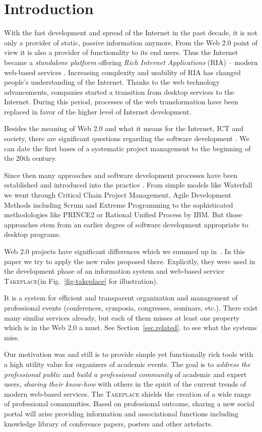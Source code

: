 \documentclass[conference]{IEEEtran}
\newcommand\tp{\textsc{Takeplace}\xspace}
\begin{document}
\section{Introduction}
With the fast development and spread of the Internet in the past decade, it is
not only a provider of static, passive information anymore. From the Web 2.0
point of view it is also a provider of functionality to its end users.  Thus
the Internet became a \emph{standalone platform} offering \emph{Rich Internet
Applications} (RIA) -- modern web-based services \cite{o2007web}. Increasing
complexity and usability of RIA has changed people's understanding of the
Internet. Thanks to the web technology advancements, companies started a
transition from desktop services to the Internet. During this period,
processes of the web transformation have been replaced in favor of the higher
level of Internet development.

Besides the meaning of Web 2.0 and what it means for the Internet, ICT and
society, there are significant questions regarding the software development
\cite{pitner-priklady}. We can date the first bases of a systematic project
management to the beginning of the 20th century.

Since then many approaches
and software development processes have been established and introduced into
the practice \cite{stellman2005applied}. From simple models like Waterfall we
went through Critical Chain Project Management, Agile Development Methods
including Scrum and Extreme Programming to the sophisticated
methodologies like PRINCE2 or Rational Unified Process by IBM. But those
approaches stem from an earlier degree of software development appropriate
to desktop programs.

Web 2.0 projects have significant differences which we summed up
in~\cite{user-centered2010}. In this paper we try to apply the new rules
proposed there. Explicitly, they were used in the development phase of an
information system and web-based service \tp (in Fig.~\ref{fig-takeplace} for
illustration).

It is a system for efficient and transparent organization and management of
professional events (conferences, symposia, congresses, seminars, etc.). There
exist many similar services already, but each of them misses at least one
property which is in the Web 2.0 a must. See Section~\ref{sec.related}. to see
what the systems miss.

Our motivation was and still is to provide simple yet functionally rich tools
with a high utility value for organizers of academic events. The goal is to
\emph{address the professional public} and \emph{build a professional
community} of academic and expert users, \emph{sharing their know-how} with
others in the spirit of the current trends of modern web-based services.  The
\tp shields the creation of a wide range of professional communities. Based on
professional outcome, sharing a new social portal will arise providing
information and associational functions including knowledge library of
conference papers, posters and other artefacts.
\end{document}
